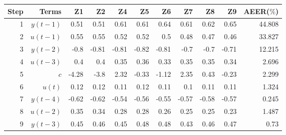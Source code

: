 \begin{tabular}{rrrrrrrrrrr}
Step & Terms & Z1 & Z2 & Z4 & Z5 & Z6 & Z7 & Z8 & Z9 & AEER($\%$) \\ 
\hline 
1 & $y(t-1)$ & 0.51 & 0.51 & 0.61 & 0.61 & 0.64 & 0.61 & 0.62 & 0.65 & 44.808 \\ 
2 & $u(t-1)$ & 0.55 & 0.55 & 0.52 & 0.52 & 0.5 & 0.48 & 0.47 & 0.46 & 33.827 \\ 
3 & $y(t-2)$ & -0.8 & -0.81 & -0.81 & -0.82 & -0.81 & -0.7 & -0.7 & -0.71 & 12.215 \\ 
4 & $u(t-3)$ & 0.4 & 0.4 & 0.35 & 0.36 & 0.33 & 0.35 & 0.35 & 0.34 & 2.696 \\ 
5 & $c$ & -4.28 & -3.8 & 2.32 & -0.33 & -1.12 & 2.35 & 0.43 & -0.23 & 2.299 \\ 
6 & $u(t)$ & 0.12 & 0.12 & 0.11 & 0.12 & 0.11 & 0.1 & 0.11 & 0.11 & 1.324 \\ 
7 & $y(t-4)$ & -0.62 & -0.62 & -0.54 & -0.56 & -0.55 & -0.57 & -0.58 & -0.57 & 0.245 \\ 
8 & $u(t-2)$ & 0.35 & 0.34 & 0.28 & 0.28 & 0.26 & 0.25 & 0.25 & 0.23 & 1.487 \\ 
9 & $y(t-3)$ & 0.45 & 0.46 & 0.45 & 0.48 & 0.48 & 0.43 & 0.46 & 0.47 & 0.73 \\ 
\hline 
\end{tabular}